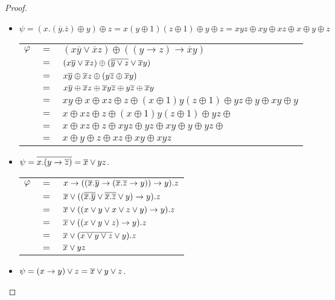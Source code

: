 \begin{proof}
\begin{itemize}
  \item
    $\psi = (x.(\overline{y}.\overline{z})\oplus y)\oplus z = x(y\oplus 1)(z\oplus 1) \oplus y \oplus z = xyz \oplus xy \oplus xz \oplus x \oplus y \oplus z$
    
    \begin{tabular}{l c l}
      $\varphi$ & $=$ & $(x\overline{y}\vee \overline{x}z)\oplus ((y\rightarrow z)\rightarrow \overline{x}y)$\\
      & $=$ & $(x\overline{y}\vee \overline{x}z) \oplus (\overline{\overline{y}\vee z} \vee \overline{x}y)$ \\
      & $=$ & $x\overline{y}\oplus \overline{x}z \oplus (y\overline{z} \oplus \overline{x}y)$ \\
      & $=$ & $x\overline{y}\oplus \overline{x}z\oplus \overline{x}y\overline{z} \oplus y\overline{z} \oplus \overline{x}y$ \\
      & $=$ & $xy \oplus x \oplus xz \oplus z \oplus (x\oplus 1)y(z\oplus 1) \oplus yz\oplus y \oplus xy \oplus y$ \\
      & $=$ & $x \oplus xz \oplus z \oplus (x\oplus 1)y(z\oplus 1) \oplus yz\oplus $ \\
      & $=$ & $x \oplus xz \oplus z \oplus xyz \oplus yz \oplus xy \oplus y \oplus yz\oplus $ \\
      & $=$ & $x \oplus y\oplus z \oplus xz \oplus xy \oplus xyz$ \\
     \end{tabular}
     
   \item
     $\psi = \overline{x.(y\rightarrow\overline{z})} = \overline{x}\vee yz$.
     
     \begin{tabular}{l c l}
       $\varphi$ & $ = $ & $x\rightarrow ((\overline{x}.\overline{y}\rightarrow(\overline{x}.\overline{z}\rightarrow y))\rightarrow y).z$\\
       & $=$ & $\overline{x} \vee ((\overline{\overline{x}.\overline{y}} \vee \overline{\overline{x}.\overline{z}}\vee y)\rightarrow y).z$\\
       & $=$ & $\overline{x} \vee ((x\vee y \vee x\vee z \vee y)\rightarrow y).z$\\
       & $=$ & $\overline{x} \vee ((x\vee y \vee z)\rightarrow y).z$\\
       & $=$ & $\overline{x} \vee (\overline{x\vee y \vee z}\vee y).z$\\
       & $=$ & $\overline{x} \vee yz$
     \end{tabular}

     
  \item
    $\psi = (x\rightarrow y)\vee z = \overline{x}\vee y \vee z$.
    

\end{itemize}
\end{proof}
